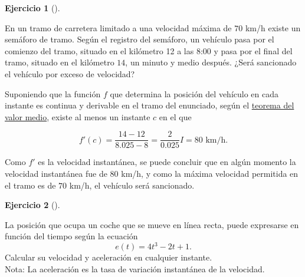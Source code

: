 \documentclass[
  spanish,
  a4paper,
]{scrreport}
\theoremstyle{definition}
\newtheorem{exercise}{Ejercicio}[chapter]
\theoremstyle{remark}
\begin{document}
\begin{exercise}[]\protect\hypertarget{exr-teorema-valor-medio}{}\label{exr-teorema-valor-medio}

En un tramo de carretera limitado a una velocidad máxima de \(70\) km/h
existe un semáforo de tramo. Según el registro del semáforo, un vehículo
pasa por el comienzo del tramo, situado en el kilómetro 12 a las 8:00 y
pasa por el final del tramo, situado en el kilómetro \(14\), un minuto y
medio después. ¿Será sancionado el vehículo por exceso de velocidad?

\end{exercise}

\begin{tcolorbox}[enhanced jigsaw, arc=.35mm, bottomrule=.15mm, bottomtitle=1mm, breakable, colback=white, colbacktitle=quarto-callout-tip-color!10!white, colframe=quarto-callout-tip-color-frame, coltitle=black, left=2mm, leftrule=.75mm, opacityback=0, opacitybacktitle=0.6, rightrule=.15mm, title=\textcolor{quarto-callout-tip-color}{\faLightbulb}\hspace{0.5em}{Solución}, titlerule=0mm, toprule=.15mm, toptitle=1mm]

Suponiendo que la función \(f\) que determina la posición del vehículo
en cada instante es continua y derivable en el tramo del enunciado,
según el
\href{https://aprendeconalf.es/analisis-manual/derivadas.html\#thm-valor-medio}{teorema
del valor medio}, existe al menos un instante \(c\) en el que

\[
f'(c) = \frac{14-12}{8.025-8} = \frac{2}{0.025}I= 80 \mbox{ km/h}.
\]

Como \(f'\) es la velocidad instantánea, se puede concluir que en algún
momento la velocidad instantánea fue de 80 km/h, y como la máxima
velocidad permitida en el tramo es de \(70\) km/h, el vehículo será
sancionado.

\end{tcolorbox}

\begin{exercise}[]\protect\hypertarget{exr-cinematica-1}{}\label{exr-cinematica-1}

La posición que ocupa un coche que se mueve en línea recta, puede
expresarse en función del tiempo según la ecuación \[
e(t) = 4t^3 -2t +1.
\] Calcular su velocidad y aceleración en cualquier instante.\\
Nota: La aceleración es la tasa de variación instantánea de la
velocidad.

\end{exercise}
\end{document}
